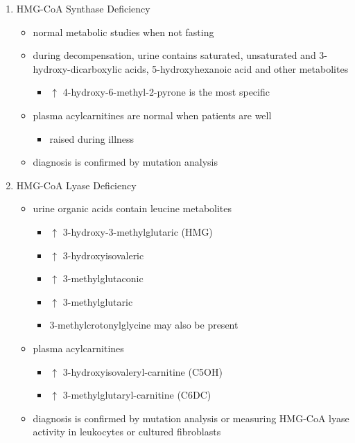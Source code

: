 \documentclass[12pt]{scrartcl}
\begin{document}
\begin{enumerate}
\item HMG-CoA Synthase Deficiency
\label{sec:orga60a378}
\begin{itemize}
\item normal metabolic studies when not fasting
\item during decompensation, urine contains saturated, unsaturated and
3-hydroxy-dicarboxylic acids, 5-hydroxyhexanoic acid and other
metabolites
\begin{itemize}
\item \(\uparrow\) 4-hydroxy-6-methyl-2-pyrone is the most specific
\end{itemize}
\item plasma acylcarnitines are normal when patients are well
\begin{itemize}
\item raised during illness
\end{itemize}
\item diagnosis is confirmed by mutation analysis
\end{itemize}

\item HMG-CoA Lyase Deficiency
\label{sec:org6a7ddaa}
\begin{itemize}
\item urine organic acids contain leucine metabolites
\begin{itemize}
\item \(\uparrow\) 3-hydroxy-3-methylglutaric (HMG)
\item \(\uparrow\) 3-hydroxyisovaleric
\item \(\uparrow\) 3-methylglutaconic
\item \(\uparrow\) 3-methylglutaric
\item 3-methylcrotonylglycine may also be present
\end{itemize}
\item plasma acylcarnitines
\begin{itemize}
\item \(\uparrow\) 3-hydroxyisovaleryl-carnitine (C5OH)
\item \(\uparrow\) 3-methylglutaryl-carnitine (C6DC)
\end{itemize}
\item diagnosis is confirmed by mutation analysis or measuring HMG-CoA
lyase activity in leukocytes or cultured fibroblasts
\end{itemize}
\end{enumerate}
\end{document}
